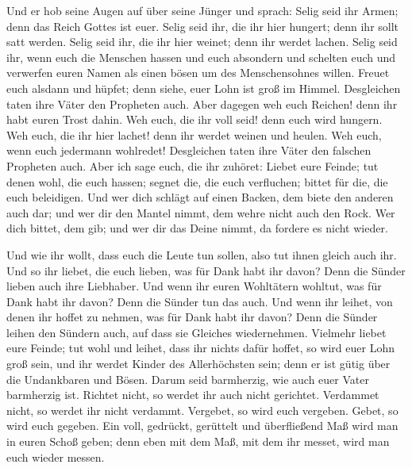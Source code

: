  Und er hob seine Augen auf über seine Jünger und sprach:
Selig seid ihr Armen; denn das Reich Gottes ist euer. 
Selig seid ihr, die ihr hier hungert; denn ihr sollt satt werden. Selig
seid ihr, die ihr hier weinet; denn ihr werdet lachen. 
Selig seid ihr, wenn euch die Menschen hassen und euch absondern und
schelten euch und verwerfen euren Namen als einen bösen um des
Menschensohnes willen.  Freuet euch alsdann und hüpfet;
denn siehe, euer Lohn ist groß im Himmel. Desgleichen taten ihre Väter
den Propheten auch.  Aber dagegen weh euch Reichen! denn
ihr habt euren Trost dahin.  Weh euch, die ihr voll seid!
denn euch wird hungern. Weh euch, die ihr hier lachet! denn ihr werdet
weinen und heulen.  Weh euch, wenn euch jedermann
wohlredet! Desgleichen taten ihre Väter den falschen Propheten auch.
 Aber ich sage euch, die ihr zuhöret: Liebet eure Feinde;
tut denen wohl, die euch hassen;  segnet die, die euch
verfluchen; bittet für die, die euch beleidigen.  Und wer
dich schlägt auf einen Backen, dem biete den anderen auch dar; und wer
dir den Mantel nimmt, dem wehre nicht auch den Rock.  Wer
dich bittet, dem gib; und wer dir das Deine nimmt, da fordere es nicht
wieder.

 Und wie ihr wollt, dass euch die Leute tun sollen, also
tut ihnen gleich auch ihr.  Und so ihr liebet, die euch
lieben, was für Dank habt ihr davon? Denn die Sünder lieben auch ihre
Liebhaber.  Und wenn ihr euren Wohltätern wohltut, was
für Dank habt ihr davon? Denn die Sünder tun das auch. 
Und wenn ihr leihet, von denen ihr hoffet zu nehmen, was für Dank habt
ihr davon? Denn die Sünder leihen den Sündern auch, auf dass sie
Gleiches wiedernehmen.  Vielmehr liebet eure Feinde; tut
wohl und leihet, dass ihr nichts dafür hoffet, so wird euer Lohn groß
sein, und ihr werdet Kinder des Allerhöchsten sein; denn er ist gütig
über die Undankbaren und Bösen.  Darum seid barmherzig,
wie auch euer Vater barmherzig ist.  Richtet nicht, so
werdet ihr auch nicht gerichtet. Verdammet nicht, so werdet ihr nicht
verdammt. Vergebet, so wird euch vergeben.  Gebet, so
wird euch gegeben. Ein voll, gedrückt, gerüttelt und überfließend Maß
wird man in euren Schoß geben; denn eben mit dem Maß, mit dem ihr
messet, wird man euch wieder messen.

